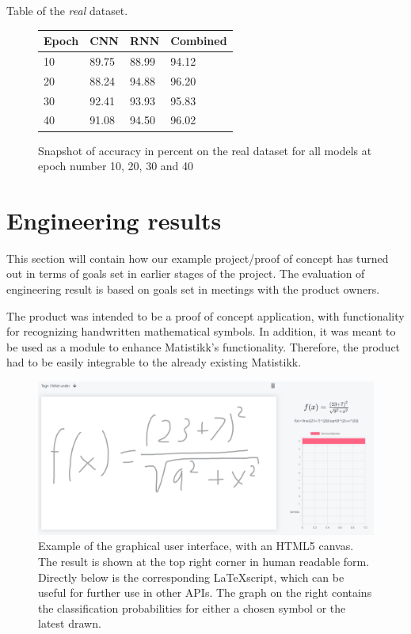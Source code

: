 Table of the \textit{real} dataset.
\begin{figure}[H]
    \centering
    \begin{tabular}{| p{2cm} | p{3cm} | p{3cm} | p{3cm} |}
    \hline
    Epoch & \textbf{CNN} & \textbf{RNN} & \textbf{Combined} \\ \hline
    10 & 89.75 & 88.99 & 94.12 \\ \hline
    20 & 88.24 & 94.88 & 96.20 \\ \hline
    30 & 92.41 & 93.93 & 95.83 \\ \hline
    40 & 91.08 & 94.50 & 96.02 \\ \hline
    \end{tabular}
    \caption{Snapshot of accuracy in percent on the real dataset for all models at epoch number 10, 20, 30 and 40}
    \label{fig:table_real_dataset}

\end{figure}

\section{Engineering results}
This section will contain how our example project/proof of concept has turned out in terms of goals set in earlier stages of the project. The evaluation of engineering result is based on goals set in meetings with the product owners. %

The product was intended to be a proof of concept application, with functionality for recognizing handwritten mathematical symbols. In addition, it was meant to be used as a module to enhance Matistikk's functionality. Therefore, the product had to be easily integrable to the already existing Matistikk. 


\begin{figure}[H]
    \centering
    \includegraphics[width=\textwidth]{Assets/Chapter4_Result/predictor_example.png}
    \caption{Example of the graphical user interface, with an HTML5 canvas. The result is shown at the top right corner in human readable form. Directly below is the corresponding \LaTeX script, which can be useful for further use in other APIs. The graph on the right contains the classification probabilities for either a chosen symbol or the latest drawn.}
    \label{fig:predictor_example}
\end{figure}

